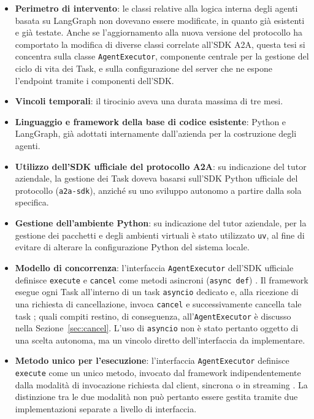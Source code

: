 \begin{itemize}
    \item \textbf{Perimetro di intervento}: le classi relative alla logica interna degli agenti basata su LangGraph non dovevano essere modificate, in quanto già esistenti e già testate. Anche se l'aggiornamento alla nuova versione del protocollo ha comportato la modifica di diverse classi correlate all'SDK A2A, questa tesi si concentra sulla classe \texttt{AgentExecutor}, componente centrale per la gestione del ciclo di vita dei Task, e sulla configurazione del server che ne espone l'endpoint tramite i componenti dell'SDK.
    \item \textbf{Vincoli temporali}: il tirocinio aveva una durata massima di tre mesi.
    \item \textbf{Linguaggio e framework della base di codice esistente}: Python e LangGraph, già adottati internamente dall'azienda per la costruzione degli agenti.
    \item \textbf{Utilizzo dell'SDK ufficiale del protocollo A2A}: su indicazione del tutor aziendale, la gestione dei Task doveva basarsi sull'SDK Python ufficiale del protocollo (\texttt{a2a-sdk}), anziché su uno sviluppo autonomo a partire dalla sola specifica.
    \item \textbf{Gestione dell'ambiente Python}: su indicazione del tutor aziendale, per la gestione dei pacchetti e degli ambienti virtuali è stato utilizzato \texttt{uv}, al fine di evitare di alterare la configurazione Python del sistema locale.
    \item \textbf{Modello di concorrenza}: l'interfaccia \texttt{AgentExecutor} dell'SDK ufficiale definisce \texttt{execute} e \texttt{cancel} come metodi asincroni (\texttt{async def}) \cite{a2apythondocs}. Il framework esegue ogni Task all'interno di un task \texttt{asyncio} dedicato e, alla ricezione di una richiesta di cancellazione, invoca \texttt{cancel} e successivamente cancella tale task \cite{a2apythonsdk}; quali compiti restino, di conseguenza, all'\texttt{AgentExecutor} è discusso nella Sezione~\ref{sec:cancel}. L'uso di \texttt{asyncio} non è stato pertanto oggetto di una scelta autonoma, ma un vincolo diretto dell'interfaccia da implementare.
    \item \textbf{Metodo unico per l'esecuzione}: l'interfaccia \texttt{AgentExecutor} definisce \texttt{execute} come un unico metodo, invocato dal framework indipendentemente dalla modalità di invocazione richiesta dal client, sincrona o in streaming \cite{a2apythondocs}. La distinzione tra le due modalità non può pertanto essere gestita tramite due implementazioni separate a livello di interfaccia.
\end{itemize}

